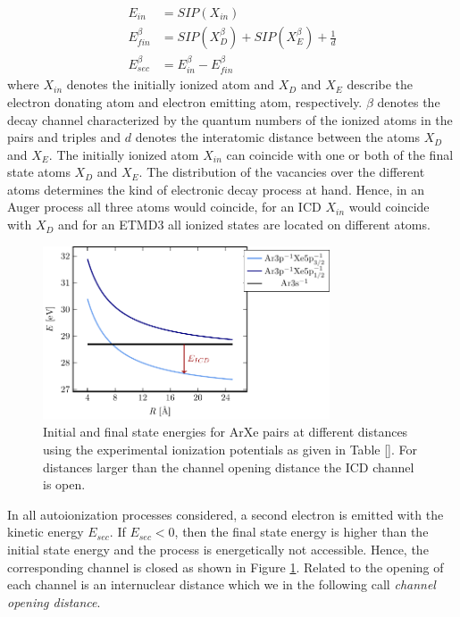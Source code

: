 \begin{align}
 E_{in}        &= SIP(X_{in}) \label{equation:E_in}\\
 E_{fin}^\beta &= SIP(X_{D}^\beta) + SIP(X_{E}^\beta) + \frac 1d
           \label{equation:E_fin}\\
 E_{sec}^\beta &= E_{in}^\beta - E_{fin}^\beta \label{equation:E_sec}
\end{align}
where $X_{in}$ denotes the initially ionized atom and
$X_{D}$ and $X_{E}$ describe the electron donating atom and electron
emitting atom, respectively.
$\beta$ denotes the decay channel characterized
by the quantum numbers of the ionized atoms in the pairs
and triples and $d$ denotes the interatomic distance between the atoms
$X_{D}$ and $X_{E}$. The initially ionized atom $X_{in}$ can
coincide with one or both of
the final state atoms
$X_{D}$ and $X_{E}$.
The distribution of the vacancies over the different
atoms determines the kind of electronic decay process at hand. Hence, in an
Auger process all three atoms would coincide, for an ICD $X_{in}$
would coincide with $X_{D}$ and for an {ETMD}3
all ionized states are located on different atoms.

\begin{figure}[h]
 \centering
 \includegraphics[width=8.5cm]{pics/channel_open_ICD.pdf}
 \caption{Initial and final state energies for ArXe pairs at different
          distances using the experimental ionization potentials as given
          in Table \ref{}. For distances larger than the channel opening
          distance the ICD channel is open.}
 \label{figure:channel_open_ICD}
\end{figure}

In all autoionization processes considered, a second electron
is emitted with the kinetic energy $E_{sec}$. If $E_{sec}<0$, then
the final state energy is higher than the initial state energy and the        
process is energetically not accessible. Hence, the corresponding channel     
is closed as shown in Figure \ref{figure:channel_open_ICD}. Related to
the opening of each channel is an internuclear distance which we in the
following call \emph{channel opening distance}.
                                                               
